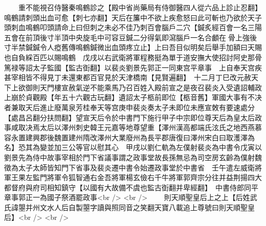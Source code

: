 　　重不能視召侍醫秦鳴鶴診之【殿中省尚藥局有侍御醫四人從六品上診止忍翻】鳴鶴請刺頭出血可愈【刺七亦翻】天后在簾中不欲上疾愈怒曰此可斬也乃欲於天子頭刺血鳴鶴叩頭請命上曰但刺之未必不佳乃刺百會腦戶二穴【鍼炙經百會一名三陽五會在前頂後寸半頂中央旋毛中可容豆鍼二分得氣即瀉腦戶一名合顱在骨上強後寸半禁鍼鍼令人瘂舊傳鳴鶴鍼微出血頭疼立止】上曰吾目似明矣后舉手加額曰天賜也自負綵百匹以賜鳴鶴　戊戌以右武衛將軍程務挺為單于道安撫大使招討阿史那骨篤禄等詔太子監國【監古衘翻】以裴炎劉景先郭正一同東宫平章事　上自奉天宫疾甚宰相皆不得見丁未還東都百官見於天津橋南【見賢遍翻】　十二月丁巳改元赦天下上欲御則天門樓宣赦氣逆不能乘馬乃召百姓入殿前宣之是夜召裴炎入受遺詔輔政上崩於貞觀殿【年五十六觀古玩翻】遺詔太子柩前即位【柩音舊】軍國大事有不决者兼取天后進止廢萬泉芳桂奉天等宫庚申裴炎奏太子未即位未應宣敇有要速處分【處昌呂翻分扶問翻】望宣天后令於中書門下施行甲子中宗即位尊天后為皇太后政事咸取决焉太后以澤州刺史韓王元嘉等地尊望重【澤州漢高都端氏泫氏之地西燕慕容永置建興郡後魏置建州隋改澤州大業廢州為長平郡唐復曰澤州宋白曰取濩澤為名】恐其為變並加三公等官以慰其心　甲戌以劉仁軌為左僕射裴炎為中書令戊寅以劉景先為侍中故事宰相於門下省議事謂之政事堂故長孫無忌為司空房玄齡為僕射魏徵為太子太師皆知門下省事及裴炎遷中書令始遷政事堂於中書省　壬午遣左威衛將軍王果左監門將軍令狐智通右金吾將軍楊玄儉右千牛將軍郭齊宗分往并益荆揚四大都督府與府司相知鎮守【以國有大故備不虞也監古衘翻并卑經翻】　中書侍郎同平章事郭正一為國子祭酒罷政事<br />
<br />
　　則天順聖皇后上之上【后姓武氏諱曌并州文水人后自製曌字讀與照同音之笑翻天寶八載追上尊號曰則天順聖皇后】<br />
<br />
